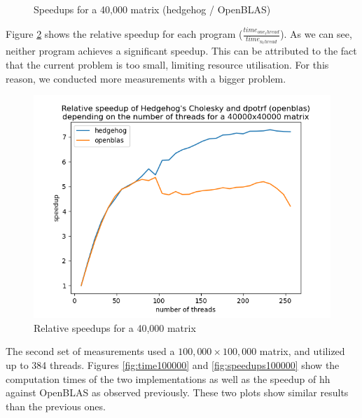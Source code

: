 \begin{figure}[!htb]
\begin{minipage}{0.48\linewidth}
    \caption{Speedups for a 40,000 matrix (hedgehog / OpenBLAS)}
    \label{fig:speedups40000}
  \end{minipage}
\end{figure}

Figure \ref{fig:relativespeedup40000} shows the relative speedup for each
program ($\frac{time_{one_thread}}{time_{n_thread}}$). As we can see, neither
program achieves a significant speedup. This can be attributed to the fact that
the current problem is too small, limiting resource utilisation. For this
reason, we conducted more measurements with a bigger problem.

\begin{figure}[!ht]
  \begin{center}
    \includegraphics[scale=0.8]{img/cho-img/relative-speedup-40000.png}
    \caption{Relative speedups for a 40,000 matrix}
    \label{fig:relativespeedup40000}
  \end{center}
\end{figure}

The second set of measurements used a $100,000\times100,000$ matrix, and utilized up
to 384 threads. Figures \ref{fig:time100000} and \ref{fig:speedups100000} show
the computation times of the two implementations as well as the speedup of
\gls{hh} against OpenBLAS as observed previously. These two plots show similar
results than the previous ones.

